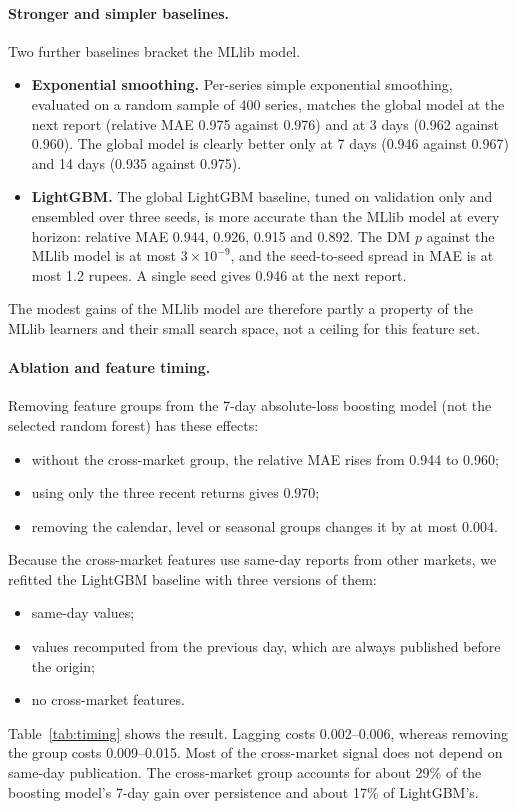 \paragraph{Stronger and simpler baselines.}
Two further baselines bracket the MLlib model.
\begin{itemize}
  \item \textbf{Exponential smoothing.} Per-series simple exponential smoothing, evaluated on a random sample of 400 series, matches the global model at the next report (relative MAE 0.975 against 0.976) and at 3 days (0.962 against 0.960). The global model is clearly better only at 7 days (0.946 against 0.967) and 14 days (0.935 against 0.975).
  \item \textbf{LightGBM.} The global LightGBM baseline, tuned on validation only and ensembled over three seeds, is more accurate than the MLlib model at every horizon: relative MAE 0.944, 0.926, 0.915 and 0.892. The DM $p$ against the MLlib model is at most $3\times10^{-9}$, and the seed-to-seed spread in MAE is at most 1.2 rupees. A single seed gives 0.946 at the next report.
\end{itemize}
The modest gains of the MLlib model are therefore partly a property of the MLlib learners and their small search space, not a ceiling for this feature set.

\paragraph{Ablation and feature timing.}
Removing feature groups from the 7-day absolute-loss boosting model (not the selected random forest) has these effects:
\begin{itemize}
  \item without the cross-market group, the relative MAE rises from 0.944 to 0.960;
  \item using only the three recent returns gives 0.970;
  \item removing the calendar, level or seasonal groups changes it by at most 0.004.
\end{itemize}
Because the cross-market features use same-day reports from other markets, we refitted the LightGBM baseline with three versions of them:
\begin{itemize}
  \item same-day values;
  \item values recomputed from the previous day, which are always published before the origin;
  \item no cross-market features.
\end{itemize}
Table~\ref{tab:timing} shows the result. Lagging costs 0.002--0.006, whereas removing the group costs 0.009--0.015. Most of the cross-market signal does not depend on same-day publication. The cross-market group accounts for about 29\% of the boosting model's 7-day gain over persistence and about 17\% of LightGBM's.

